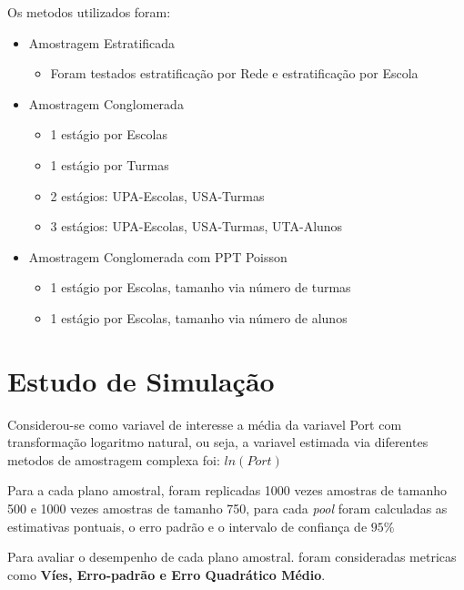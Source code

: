 \documentclass[sn-basic,pdflatex]{sn-jnl}
\theoremstyle{remark}
\theoremstyle{definition}
\providecommand{\tightlist}{%
  \setlength{\itemsep}{0pt}\setlength{\parskip}{0pt}}
\begin{document}
Os metodos utilizados foram:

\begin{itemize}
\item
  Amostragem Estratificada

  \begin{itemize}
  \tightlist
  \item
    Foram testados estratificação por Rede e estratificação por Escola
  \end{itemize}
\item
  Amostragem Conglomerada

  \begin{itemize}
  \item
    1 estágio por Escolas
  \item
    1 estágio por Turmas
  \item
    2 estágios: UPA-Escolas, USA-Turmas
  \item
    3 estágios: UPA-Escolas, USA-Turmas, UTA-Alunos
  \end{itemize}
\item
  Amostragem Conglomerada com PPT Poisson

  \begin{itemize}
  \tightlist
  \item
    1 estágio por Escolas, tamanho via número de turmas
  \item
    1 estágio por Escolas, tamanho via número de alunos
  \end{itemize}
\end{itemize}

\hypertarget{estudo-de-simulauxe7uxe3o}{%
\section{Estudo de Simulação}\label{estudo-de-simulauxe7uxe3o}}

Considerou-se como variavel de interesse a média da variavel Port com
transformação logaritmo natural, ou seja, a variavel estimada via
diferentes metodos de amostragem complexa foi: \(ln({Port})\)

Para a cada plano amostral, foram replicadas 1000 vezes amostras de
tamanho 500 e 1000 vezes amostras de tamanho 750, para cada \emph{pool}
foram calculadas as estimativas pontuais, o erro padrão e o intervalo de
confiança de \(95\%\)

Para avaliar o desempenho de cada plano amostral. foram consideradas
metricas como \textbf{Víes, Erro-padrão e Erro Quadrático Médio}.
\end{document}
